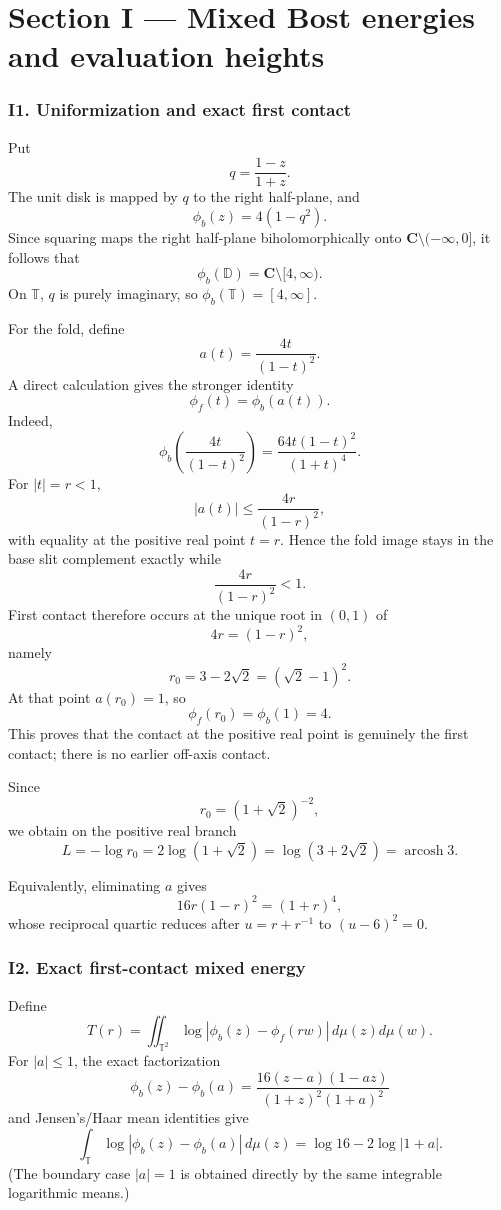 \documentclass[
  10pt,
  letterpaper,
]{article}
\theoremstyle{definition}
\theoremstyle{remark}
\begin{document}
\section{Section I --- Mixed Bost energies and evaluation
heights}\label{section-i-mixed-bost-energies-and-evaluation-heights}

\subsubsection{I1. Uniformization and exact first
contact}\label{i1.-uniformization-and-exact-first-contact}

Put \[
q=\frac{1-z}{1+z}.
\] The unit disk is mapped by \(q\) to the right half-plane, and \[
\phi_b(z)=4(1-q^2).
\] Since squaring maps the right half-plane biholomorphically onto
\(\mathbf C\setminus(-\infty,0]\), it follows that \[
\phi_b(\mathbb D)=\mathbf C\setminus[4,\infty).
\] On \(\mathbb T\), \(q\) is purely imaginary, so
\(\phi_b(\mathbb T)=[4,\infty]\).

For the fold, define \[
a(t)=\frac{4t}{(1-t)^2}.
\] A direct calculation gives the stronger identity \[
\boxed{\phi_f(t)=\phi_b(a(t)).}
\] Indeed, \[
\phi_b\!\left(\frac{4t}{(1-t)^2}\right)
=\frac{64t(1-t)^2}{(1+t)^4}.
\] For \(|t|=r<1\), \[
|a(t)|\le \frac{4r}{(1-r)^2},
\] with equality at the positive real point \(t=r\). Hence the fold
image stays in the base slit complement exactly while \[
\frac{4r}{(1-r)^2}<1.
\] First contact therefore occurs at the unique root in \((0,1)\) of \[
4r=(1-r)^2,
\] namely \[
\boxed{r_0=3-2\sqrt2=(\sqrt2-1)^2.}
\] At that point \(a(r_0)=1\), so \[
\phi_f(r_0)=\phi_b(1)=4.
\] This proves that the contact at the positive real point is genuinely
the first contact; there is no earlier off-axis contact.

Since \[
r_0=(1+\sqrt2)^{-2},
\] we obtain on the positive real branch \[
L=-\log r_0
=2\log(1+\sqrt2)
=\log(3+2\sqrt2)
=\boxed{\operatorname{arcosh}3}.
\]

Equivalently, eliminating \(a\) gives \[
16r(1-r)^2=(1+r)^4,
\] whose reciprocal quartic reduces after \(u=r+r^{-1}\) to
\((u-6)^2=0\).

\subsubsection{I2. Exact first-contact mixed
energy}\label{i2.-exact-first-contact-mixed-energy}

Define \[
T(r)=\iint_{\mathbb T^2}
\log|\phi_b(z)-\phi_f(rw)|\,d\mu(z)d\mu(w).
\] For \(|a|\le1\), the exact factorization \[
\phi_b(z)-\phi_b(a)
=
\frac{16(z-a)(1-az)}{(1+z)^2(1+a)^2}
\] and Jensen's/Haar mean identities give \[
\int_{\mathbb T}
\log|\phi_b(z)-\phi_b(a)|\,d\mu(z)
=\log16-2\log|1+a|.
\tag{I.1}
\] (The boundary case \(|a|=1\) is obtained directly by the same
integrable logarithmic means.)
\end{document}
